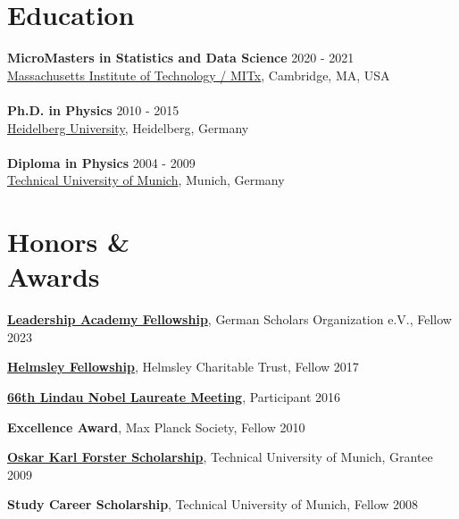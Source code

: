 \documentclass[margin,line]{res}
\begin{document}
\begin{resume}

\section{\sc Education}
{\bf MicroMasters in Statistics and Data Science} \hfill {2020 - 2021}\\
\href{https://micromasters.mit.edu/ds/}{Massachusetts Institute of Technology / MITx}, Cambridge, MA, USA\\
\vspace*{-3mm}\\
{\bf Ph.D. in Physics} \hfill {2010 - 2015}\\
\href{https://www.uni-heidelberg.de/en}{Heidelberg University}, Heidelberg, Germany\\
\vspace*{-3mm}\\
{\bf Diploma in Physics} \hfill {2004 - 2009}\\
\href{https://www.tum.de/en/}{Technical University of Munich}, Munich, Germany


\section{\sc Honors \& \\Awards} 
{\bf \href{https://gsonet.org/funding-programs/leadership-academy/?lang=en}{Leadership Academy Fellowship}}, German Scholars Organization e.V., Fellow  \hfill 2023

\vspace*{-4mm}
{\bf \href{https://meetings.cshl.edu/helmsleylist.aspx}{Helmsley Fellowship}}, Helmsley Charitable Trust, Fellow  \hfill 2017    

\vspace*{-4mm}
{\bf \href{http://www.lindau-nobel.org/}{66th Lindau Nobel Laureate Meeting}}, Participant \hfill {2016}   

\vspace*{-4mm}
{\bf Excellence Award}, Max Planck Society, Fellow \hfill 2010

\vspace*{-4mm}
{\bf \href{https://www.tum.de/en/studies/fees-and-financial-aid/scholarships/tum-scholarships/}{Oskar Karl Forster Scholarship}}, Technical University of Munich, Grantee  \hfill 2009

\vspace*{-4mm}
{\bf Study Career Scholarship}, Technical University of Munich, Fellow  \hfill 2008


\end{resume}
\end{document}
